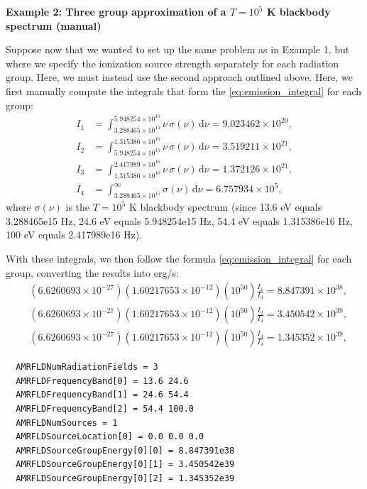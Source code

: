 \documentclass[10pt]{article}
\renewcommand{\(}{\left(}
\renewcommand{\)}{\right)}
\begin{document}
\begin{shaded}
{\bf Example 2:  Three group approximation of a $T=10^5$ K blackbody
  spectrum (manual)}

Suppose now that we wanted to set up the same problem as in Example 1,
but where we specify the ionization source strength separately for
each radiation group.  Here, we must instead use the second approach
outlined above.  Here, we first manually compute the integrals that
form the \eqref{eq:emission_integral} for each group:
\begin{align*}
  I_1 &= \int_{3.288465\times10^{15}}^{5.948254\times10^{15}}\nu\, \sigma(\nu)\,\mathrm d\nu = 9.023462\times10^{20}, \\
  I_2 &= \int_{5.948254\times10^{15}}^{1.315386\times10^{16}}\nu\, \sigma(\nu)\,\mathrm d\nu = 3.519211\times10^{21}, \\
  I_3 &= \int_{1.315386\times10^{16}}^{2.417989\times10^{16}}\nu\, \sigma(\nu)\,\mathrm d\nu = 1.372126\times10^{21}, \\
  I_4 &=  \int_{3.288465\times10^{15}}^{\infty}\sigma(\nu)\,\mathrm d\nu = 6.757934\times10^{5},
\end{align*}
where $\sigma(\nu)$ is the $T=10^5$ K blackbody spectrum (since 13.6 eV
equals 3.288465e15 Hz, 24.6 eV equals 5.948254e15 Hz, 54.4 eV equals
1.315386e16 Hz, 100 eV equals 2.417989e16 Hz). 

With these integrals, we then follow the formula
\eqref{eq:emission_integral} for each group, converting the results
into erg/s:
\begin{align*}
  &(6.6260693\times10^{-27})(1.60217653\times10^{-12})(10^{50}) \frac{I_1}{I_4} = 8.847391\times10^{38}, \\
  &(6.6260693\times10^{-27})(1.60217653\times10^{-12})(10^{50}) \frac{I_2}{I_4} = 3.450542\times10^{39}, \\
  &(6.6260693\times10^{-27})(1.60217653\times10^{-12})(10^{50}) \frac{I_3}{I_4} = 1.345352\times10^{39},
\end{align*}
\begin{verbatim}
  AMRFLDNumRadiationFields = 3
  AMRFLDFrequencyBand[0] = 13.6 24.6
  AMRFLDFrequencyBand[1] = 24.6 54.4
  AMRFLDFrequencyBand[2] = 54.4 100.0
  AMRFLDNumSources = 1
  AMRFLDSourceLocation[0] = 0.0 0.0 0.0
  AMRFLDSourceGroupEnergy[0][0] = 8.847391e38
  AMRFLDSourceGroupEnergy[0][1] = 3.450542e39
  AMRFLDSourceGroupEnergy[0][2] = 1.345352e39
\end{verbatim}
\end{shaded}
\end{document}
